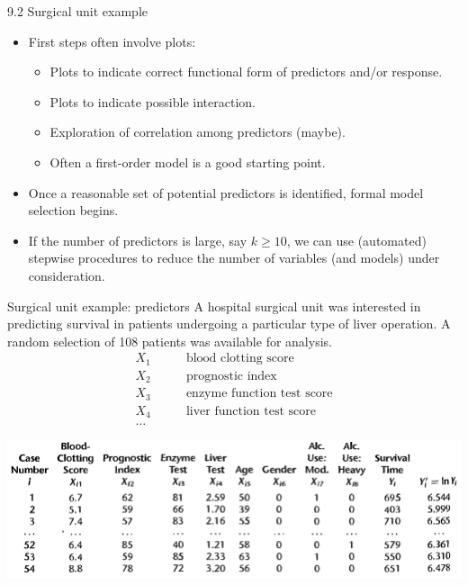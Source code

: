 \documentclass{beamer}
\begin{document}
\begin{frame}{9.2 Surgical unit example}
\begin{itemize}
\item First steps often involve plots:
\begin{itemize}
\item Plots to indicate correct functional form of predictors and/or response.
\item Plots to indicate possible interaction.
\item Exploration of correlation among predictors (maybe).
\item Often a first-order model is a good starting point.
\end{itemize}
\item Once a reasonable set of potential predictors is identified, formal model selection begins.
\item If the number of predictors is large, say $k\ge10$, we can use (automated) stepwise procedures to reduce the number of variables (and models) under consideration.
\end{itemize}
\end{frame}

\begin{frame}{Surgical unit example: predictors}
A hospital surgical unit was interested in predicting survival in patients undergoing a particular type of liver operation. A random selection of 108 patients was available for analysis.
\begin{align*}
X_1\qquad&\text{blood clotting score}\\
X_2\qquad&\text{prognostic index}\\
X_3\qquad&\text{enzyme function test score}\\
X_4\qquad&\text{liver function test score}\\
\ldots
\end{align*}
\centerline{\includegraphics[scale=0.25]{plots/dataset}}
\end{frame}
\end{document}
